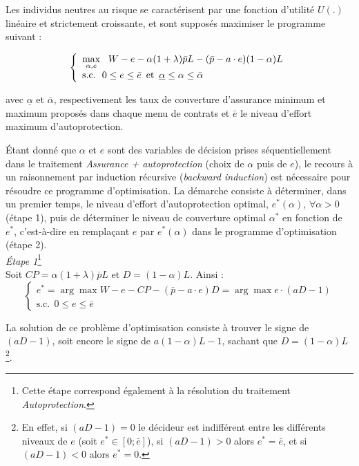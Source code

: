 \begin{Article}
\begin{refsection}[Mouminoux]
\begin{appendices}
Les individus neutres au risque se caractérisent par une fonction d'utilité $U(.)$ linéaire et strictement croissante, et sont supposés maximiser le programme suivant :

\begin{equation}
\left\{
    \begin{array}{ll}
    \displaystyle \max_{\alpha,e} ~~ W - e -\alpha(1+\lambda)\bar{p}L - (\bar{p}-a\cdot e)(1 - \alpha)L\\
    \text{s.c.} ~~0 \le e \le \bar{e}\enskip \text{et}\enskip \underline{\alpha} \le \alpha \le \bar{\alpha}
    \end{array}
\right.
\end{equation}

\noindent avec $\underline{\alpha}$ et $\bar{\alpha}$, respectivement les taux de couverture d'assurance minimum et maximum proposés dans chaque menu de contrats et $\bar{e}$ le niveau d'effort maximum d'autoprotection.

Étant donné que $\alpha$ et $e$ sont des variables de décision prises séquentiellement dans le traitement \textit{Assurance + autoprotection} (choix de $\alpha$ puis de $e$), le recours à un raisonnement par induction récursive (\textit{backward induction}) est nécessaire pour résoudre ce programme d'optimisation. La démarche consiste à déterminer, dans un premier temps, le niveau d'effort d'autoprotection optimal, $e^*(\alpha)$, $\forall\alpha>0$ (étape 1), puis de déterminer le niveau de couverture optimal $\alpha^*$ en fonction de $e^*$, c'est-à-dire en remplaçant $e$ par $e^*(\alpha)$ dans le programme d'optimisation (étape 2). \\

\textit{Étape 1}\footnote{Cette étape correspond également à la résolution du traitement \textit{Autoprotection}.}   \\

Soit $CP=\alpha(1+\lambda)\bar{p}L$ et $D=(1 - \alpha)L$. Ainsi :
\begin{equation}
\left\{
    \begin{array}{ll}
e^* = \arg\max W - e - CP - (\bar{p}-a\cdot e)D = \arg\max e \cdot (aD-1) \\
      \text{s.c.} ~~0 \le e \le \bar{e}
    \end{array}
\right.
\end{equation}

La solution de ce problème d'optimisation consiste à trouver le signe de $(aD-1)$, soit encore le signe de $a(1-\alpha )L-1$, sachant que $D=(1 - \alpha)L$\footnote{En effet, si $(aD-1)=0$ le décideur est indifférent entre les différents niveaux de $e$ (soit $e^*\in [0;\bar{e}]$), si $(aD-1)>0$ alors $e^*=\bar{e}$, et si $(aD-1)<0$ alors $e^*=0$.}.


\end{appendices}
\end{refsection}
\end{Article}

